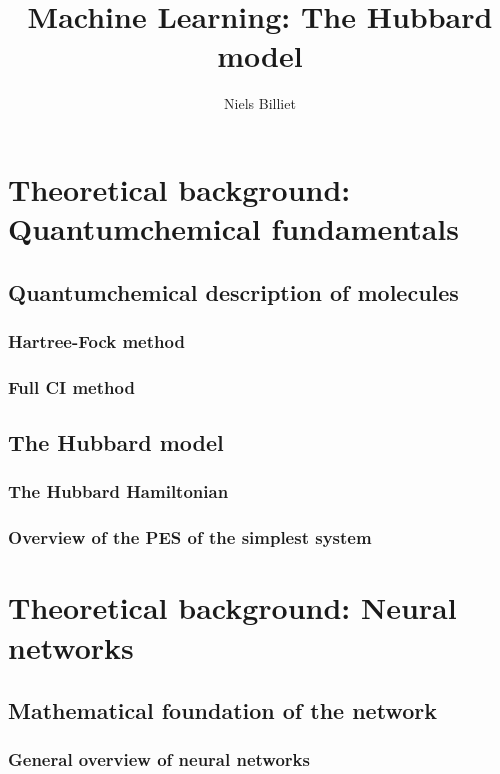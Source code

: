 \documentclass[]{report}
\title{Machine Learning: The Hubbard model}
\author{Niels Billiet}
\begin{document}
\maketitle

\begin{abstract}
\end{abstract}

\tableofcontents

\section{Theoretical background: Quantumchemical fundamentals}

\subsection{Quantumchemical description of molecules}
\subsubsection{Hartree-Fock method}
\subsubsection{Full CI method}

\subsection{The Hubbard model}
\subsubsection{The Hubbard Hamiltonian}
\subsubsection{Overview of the PES of the simplest system}


\section{Theoretical background: Neural networks}

\subsection{Mathematical foundation of the network}
\subsubsection{General overview of neural networks}
\end{document}
